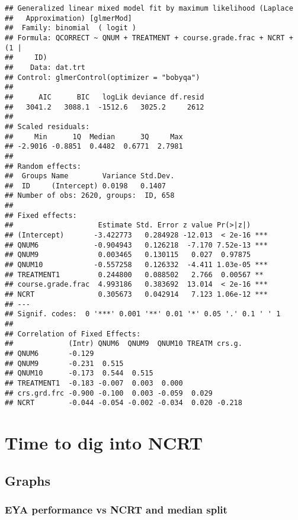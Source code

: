 \documentclass[]{article}
\begin{document}
\begin{verbatim}
## Generalized linear mixed model fit by maximum likelihood (Laplace
##   Approximation) [glmerMod]
##  Family: binomial  ( logit )
## Formula: QCORRECT ~ QNUM + TREATMENT + course.grade.frac + NCRT + (1 |  
##     ID)
##    Data: dat.trt
## Control: glmerControl(optimizer = "bobyqa")
## 
##      AIC      BIC   logLik deviance df.resid 
##   3041.2   3088.1  -1512.6   3025.2     2612 
## 
## Scaled residuals: 
##     Min      1Q  Median      3Q     Max 
## -2.9016 -0.8851  0.4482  0.6771  2.7981 
## 
## Random effects:
##  Groups Name        Variance Std.Dev.
##  ID     (Intercept) 0.0198   0.1407  
## Number of obs: 2620, groups:  ID, 658
## 
## Fixed effects:
##                    Estimate Std. Error z value Pr(>|z|)    
## (Intercept)       -3.422773   0.284928 -12.013  < 2e-16 ***
## QNUM6             -0.904943   0.126218  -7.170 7.52e-13 ***
## QNUM9              0.003465   0.130115   0.027  0.97875    
## QNUM10            -0.557258   0.126332  -4.411 1.03e-05 ***
## TREATMENT1         0.244800   0.088502   2.766  0.00567 ** 
## course.grade.frac  4.993186   0.383692  13.014  < 2e-16 ***
## NCRT               0.305673   0.042914   7.123 1.06e-12 ***
## ---
## Signif. codes:  0 '***' 0.001 '**' 0.01 '*' 0.05 '.' 0.1 ' ' 1
## 
## Correlation of Fixed Effects:
##             (Intr) QNUM6  QNUM9  QNUM10 TREATM crs.g.
## QNUM6       -0.129                                   
## QNUM9       -0.231  0.515                            
## QNUM10      -0.173  0.544  0.515                     
## TREATMENT1  -0.183 -0.007  0.003  0.000              
## crs.grd.frc -0.900 -0.100  0.003 -0.059  0.029       
## NCRT        -0.044 -0.054 -0.002 -0.034  0.020 -0.218
\end{verbatim}

\section{Time to dig into NCRT}\label{time-to-dig-into-ncrt}

\subsection{Graphs}\label{graphs}

\subsubsection{EYA performance vs NCRT and median
split}\label{eya-performance-vs-ncrt-and-median-split}
\end{document}
